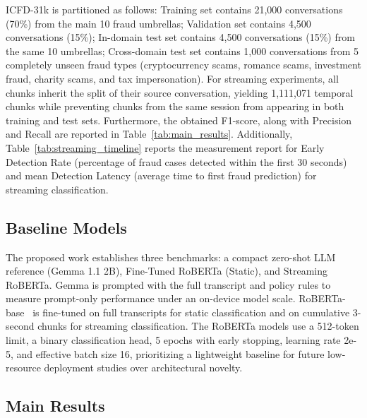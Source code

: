 \documentclass{article}
\newcommand{\crchange}[1]{{\color{blue}#1}}
\begin{document}
ICFD-31k is partitioned as follows: Training set contains 21,000 conversations (70\%) from the main 10 fraud umbrellas; Validation set contains 4,500 conversations (15\%); In-domain test set contains 4,500 conversations (15\%) from the same 10 umbrellas; Cross-domain test set contains 1,000 conversations from 5 completely unseen fraud types (cryptocurrency scams, romance scams, investment fraud, charity scams, and tax impersonation). \crchange{For streaming experiments, all chunks inherit the split of their source conversation, yielding 1,111,071 temporal chunks while preventing chunks from the same session from appearing in both training and test sets.} Furthermore, the obtained F1-score, along with Precision and Recall are reported in Table~\ref{tab:main_results}. Additionally, Table~\ref{tab:streaming_timeline} reports the measurement report for  Early Detection Rate (percentage of fraud cases detected within the first 30 seconds) and mean Detection Latency (average time to first fraud prediction) for streaming classification.

\subsection{Baseline Models}

\crchange{The proposed work establishes three benchmarks: a compact zero-shot LLM reference (Gemma 1.1 2B), Fine-Tuned RoBERTa (Static), and Streaming RoBERTa. Gemma is prompted with the full transcript and policy rules to measure prompt-only performance under an on-device model scale. RoBERTa-base~\cite{liu2019roberta} is fine-tuned on full transcripts for static classification and on cumulative 3-second chunks for streaming classification. The RoBERTa models use a 512-token limit, a binary classification head, 5 epochs with early stopping, learning rate 2e-5, and effective batch size 16, prioritizing a lightweight baseline for future low-resource deployment studies over architectural novelty.}

\subsection{Main Results}
\end{document}

